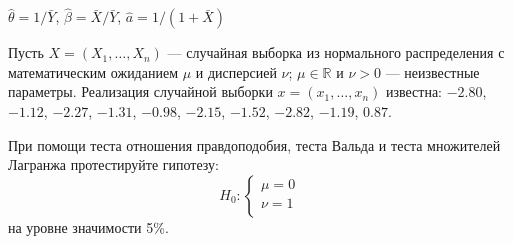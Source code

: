 \documentclass[pdftex,11pt,openany]{book}\usepackage[]{graphicx}\usepackage[]{color}
\begin{document}
\begin{solution}
$\hat{\theta}=1/\bar{Y}$, $\hat{\beta}=\bar{X}/\bar{Y}$, $\hat{a}=1/(1+\bar{X})$
\end{solution}



\begin{problem}
Пусть $X = (X_1,\ldots,X_n)$ --- случайная выборка из нормального распределения с математическим ожиданием $\mu$ и дисперсией $\nu$; $\mu \in \mathbb{R}$ и $\nu >0$ --- неизвестные параметры. Реализация случайной выборки $x = (x_1,\ldots,x_n)$ известна: $-2.80$, $-1.12$, $-2.27$, $-1.31$, $-0.98$, $-2.15$, $-1.52$, $-2.82$, $-1.19$, $0.87$.


При помощи теста отношения правдоподобия, теста Вальда и теста множителей Лагранжа протестируйте гипотезу:
$$H_0: \begin{cases}
\mu = 0 \\
\nu = 1 \\
\end{cases}$$
на уровне значимости 5\%.
\end{problem}
\end{document}
